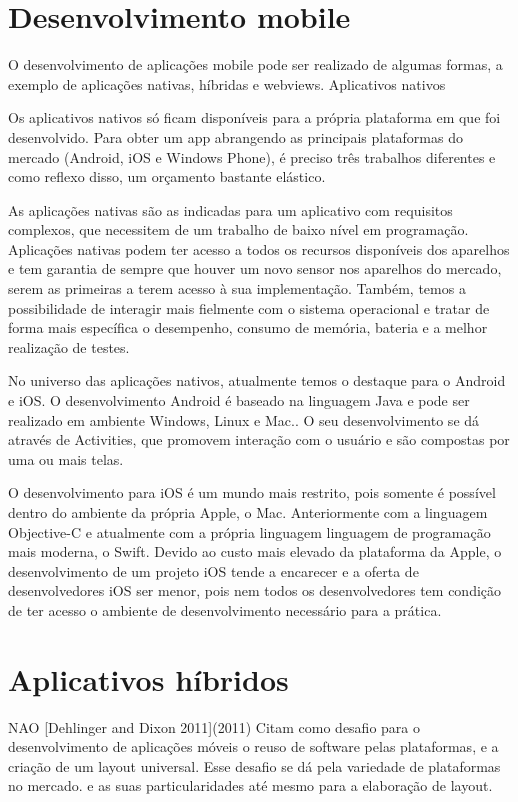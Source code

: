 \section{Desenvolvimento mobile}


O desenvolvimento de aplicações mobile pode ser realizado de algumas formas, a exemplo  de aplicações nativas, híbridas e webviews. 
Aplicativos nativos


Os aplicativos nativos só ficam disponíveis para a própria plataforma em que foi desenvolvido. Para obter um app abrangendo as principais plataformas do mercado (Android, iOS e Windows Phone), é preciso três trabalhos diferentes e como reflexo disso, um orçamento bastante elástico.


As aplicações nativas são as indicadas para um aplicativo com requisitos complexos, que necessitem de um trabalho de baixo nível em programação. Aplicações nativas podem ter acesso a todos os recursos disponíveis dos aparelhos e tem garantia de sempre que houver um novo sensor nos aparelhos do mercado, serem as primeiras a terem acesso à sua implementação. Também, temos a possibilidade de interagir mais fielmente com o sistema operacional e tratar de forma mais específica o desempenho, consumo de memória, bateria e a melhor realização de testes.


No universo das aplicações nativos, atualmente temos o destaque para o Android e iOS. O desenvolvimento Android é baseado na linguagem Java e pode ser realizado em ambiente Windows, Linux e Mac.. O seu desenvolvimento se dá através de Activities, que promovem interação com o usuário e são compostas por uma ou mais telas.


O desenvolvimento para iOS é um mundo mais restrito, pois somente é possível dentro do ambiente da própria Apple, o Mac. Anteriormente com a linguagem Objective-C e atualmente com a própria linguagem linguagem de programação mais moderna, o Swift. Devido ao custo  mais elevado da plataforma da Apple, o desenvolvimento de um projeto iOS tende a encarecer e a oferta de desenvolvedores iOS ser menor, pois nem todos os desenvolvedores tem condição de ter acesso o ambiente de desenvolvimento necessário para a prática.


\section{Aplicativos híbridos}

NAO [Dehlinger and Dixon 2011](2011) Citam como desafio para o desenvolvimento de aplicações móveis o reuso de software pelas plataformas, e a criação de um layout universal. Esse desafio se dá pela variedade de plataformas no mercado. e as suas particularidades até mesmo para a elaboração de layout.

